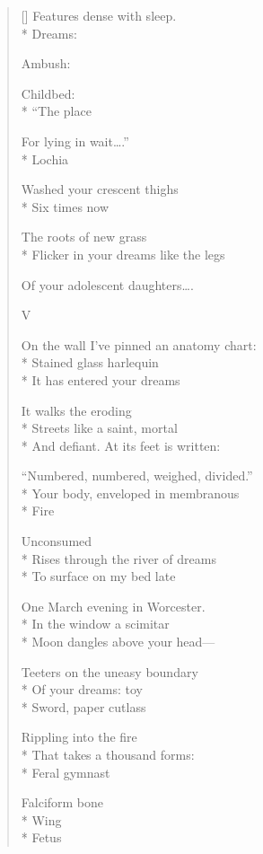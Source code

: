 \begin{verse}[\versewidth]
Features dense with sleep.\\*
Dreams:

Ambush:

Childbed:\\*
 \qquad ``The place

For lying in wait\ldots .''\\*
Lochia

Washed your crescent thighs\\*
Six times \qquad now

The roots of new grass\\*
Flicker in your dreams like the legs

Of your adolescent daughters\ldots .

\hspace{0.45\versewidth} V

On the wall I've pinned an anatomy chart: \\*
Stained glass harlequin\\*
It has entered your dreams

It walks the eroding \\*
Streets   like a saint, mortal\\*
And defiant. \qquad At its feet is written:

``Numbered, numbered, weighed, divided.''\\*
Your body, enveloped in membranous\\*
Fire

Unconsumed\\*
Rises through the river of dreams\\*
To surface on my bed late

One March evening in Worcester.\\*
In the window a scimitar \\*
Moon dangles above your head---

Teeters on the uneasy boundary\\*
Of your dreams: toy\\*
Sword, paper cutlass

Rippling into the fire\\*
That takes a thousand forms:\\*
Feral gymnast

Falciform bone\\*
Wing\\*
Fetus
\end{verse}
